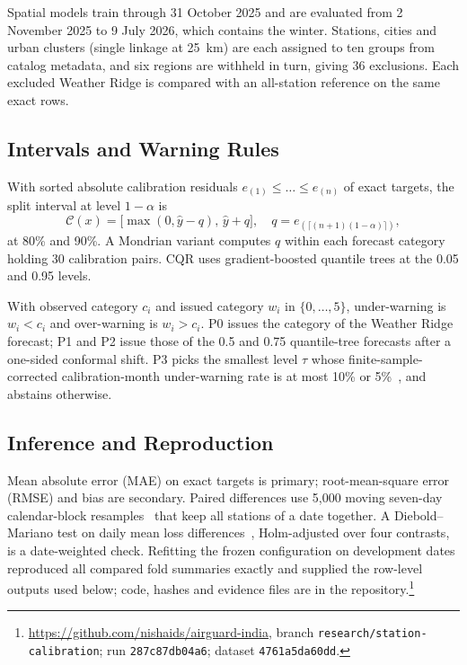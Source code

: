 \documentclass[conference,a4paper]{IEEEtran}
\begin{document}
Spatial models train through 31 October 2025 and are evaluated from 2 November 2025 to 9 July 2026, which contains the winter. Stations, cities and urban clusters (single linkage at 25~km) are each assigned to ten groups from catalog metadata, and six regions are withheld in turn, giving 36 exclusions. Each excluded Weather Ridge is compared with an all-station reference on the same \nSpatial{} exact rows.

\subsection{Intervals and Warning Rules}
With sorted absolute calibration residuals $e_{(1)} \le \dots \le e_{(n)}$ of exact targets, the split interval at level $1-\alpha$ is
\begin{equation}
\mathcal{C}(x) = \bigl[\max(0, \hat{y} - q),\, \hat{y} + q\bigr], \quad q = e_{(\lceil (n+1)(1-\alpha) \rceil)},
\label{eq:split}
\end{equation}
at 80\% and 90\%. A Mondrian variant computes $q$ within each forecast category holding 30 calibration pairs. CQR uses gradient-boosted quantile trees at the 0.05 and 0.95 levels.

With observed category $c_i$ and issued category $w_i$ in $\{0,\dots,5\}$, under-warning is $w_i < c_i$ and over-warning is $w_i > c_i$. P0 issues the category of the Weather Ridge forecast; P1 and P2 issue those of the 0.5 and 0.75 quantile-tree forecasts after a one-sided conformal shift. P3 picks the smallest level $\tau$ whose finite-sample-corrected calibration-month under-warning rate is at most 10\% or 5\%~\cite{angelopoulos2024}, and abstains otherwise.

\subsection{Inference and Reproduction}
Mean absolute error (MAE) on exact targets is primary; root-mean-square error (RMSE) and bias are secondary. Paired differences use 5{,}000 moving seven-day calendar-block resamples~\cite{kunsch1989} that keep all stations of a date together. A Diebold--Mariano test on daily mean loss differences~\cite{diebold1995}, Holm-adjusted over four contrasts, is a date-weighted check. Refitting the frozen configuration on development dates reproduced all \checksCompared{} compared fold summaries exactly and supplied the row-level outputs used below; code, hashes and evidence files are in the repository.\footnote{\raggedright\url{https://github.com/nishaids/airguard-india}, branch \texttt{research/station-calibration}; run \texttt{287c87db04a6}; dataset \texttt{4761a5da60dd}.}
\end{document}
